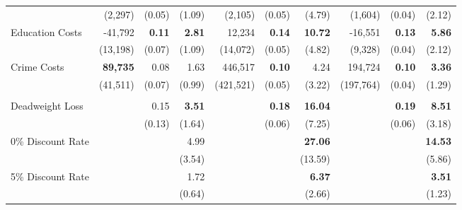 \begin{tabular}{l r r r r r r r r r}
	&	(2,297)	&	(0.05)	&	(1.09)	&	(2,105)	&	(0.05)	&	(4.79)	&	(1,604)	&	(0.04)	&	(2.12)	\\
Education Costs	&	-41,792	&	\textbf{0.11}	&	\textbf{2.81}	&	12,234	&	\textbf{0.14}	&	\textbf{10.72}	&	-16,551	&	\textbf{0.13}	&	\textbf{5.86}	\\
	&	(13,198)	&	(0.07)	&	(1.09)	&	(14,072)	&	(0.05)	&	(4.82)	&	(9,328)	&	(0.04)	&	(2.12)	\\
Crime Costs	&	\textbf{89,735}	&	0.08	&	1.63	&	446,517	&	\textbf{0.10}	&	4.24	&	194,724	&	\textbf{0.10}	&	\textbf{3.36}	\\
	&	(41,511)	&	(0.07)	&	(0.99)	&	(421,521)	&	(0.05)	&	(3.22)	&	(197,764)	&	(0.04)	&	(1.29)	\\ \\
Deadweight Loss	&		&	0.15	&	\textbf{3.51}	&		&	\textbf{0.18}	&	\textbf{16.04}	&		&	\textbf{0.19}	&	\textbf{8.51}	\\
	&		&	(0.13)	&	(1.64)	&		&	(0.06)	&	(7.25)	&		&	(0.06)	&	(3.18)	\\
0\% Discount Rate	&		&		&	4.99	&		&		&	\textbf{27.06}	&		&		&	\textbf{14.53}	\\
	&		&		&	(3.54)	&		&		&	(13.59)	&		&		&	(5.86)	\\
5\% Discount Rate	&		&		&	1.72	&		&		&	\textbf{6.37}	&		&		&	\textbf{3.51}	\\
	&		&		&	(0.64)	&		&		&	(2.66)	&		&		&	(1.23)	\\
\bottomrule																			
\end{tabular}																			
